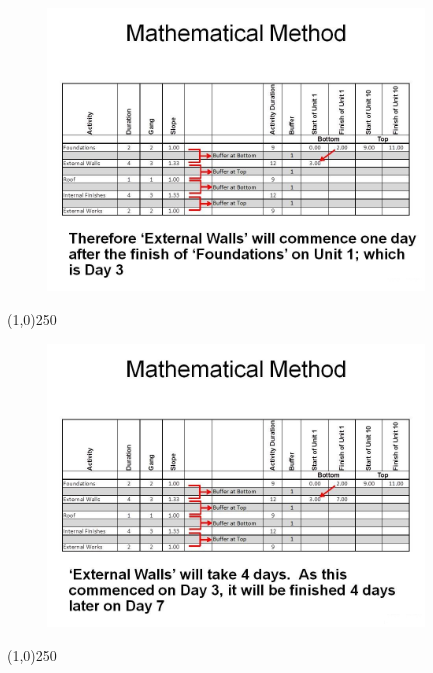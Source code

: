 \begin{frame}
\begin{figure}
	\centering
		\includegraphics[width = 10.0cm]{oldnotes/Slide286.jpg}
\end{figure}
\end{frame}
\begin{center}\line(1,0){250}\end{center}






\begin{frame}
\begin{figure}
	\centering
		\includegraphics[width = 10.0cm]{oldnotes/Slide287.jpg}
\end{figure}
\end{frame}
\begin{center}\line(1,0){250}\end{center}






